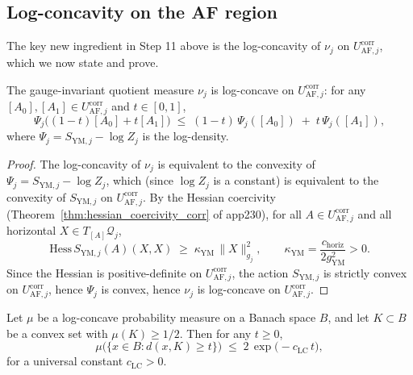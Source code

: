\subsection{Log-concavity on the AF region}
\label{ssec:app231_log_concave}

The key new ingredient in Step 11 above is the log-concavity of
$\nu_{j}$ on $U_{\mathrm{AF},j}^{\mathrm{corr}}$, which we now state
and prove.

\begin{theorem}
\label{thm:log_concave}
The gauge-invariant quotient measure $\nu_{j}$ is log-concave on
$U_{\mathrm{AF},j}^{\mathrm{corr}}$: for any $[A_{0}],[A_{1}]\in
U_{\mathrm{AF},j}^{\mathrm{corr}}$ and $t\in[0,1]$,
\begin{equation}
\label{eq:log_concave}
  \Psi_{j}\bigl((1-t)[A_{0}]+t[A_{1}]\bigr)
  \;\le\;(1-t)\,\Psi_{j}([A_{0}])\;+\;t\,\Psi_{j}([A_{1}]),
\end{equation}
where $\Psi_{j}=S_{\mathrm{YM},j}-\log Z_{j}$ is the log-density.
\end{theorem}

\begin{proof}
The log-concavity of $\nu_{j}$ is equivalent to the convexity of
$\Psi_{j}=S_{\mathrm{YM},j}-\log Z_{j}$, which (since $\log Z_{j}$ is
a constant) is equivalent to the convexity of $S_{\mathrm{YM},j}$ on
$U_{\mathrm{AF},j}^{\mathrm{corr}}$. By the Hessian coercivity
(Theorem~\ref{thm:hessian_coercivity_corr} of app230), for all
$A\in U_{\mathrm{AF},j}^{\mathrm{corr}}$ and all horizontal
$X\in T_{[A]}\mathcal{Q}_{j}$,
\begin{equation}
\label{eq:hessian_pos}
  \mathrm{Hess}\,S_{\mathrm{YM},j}(A)(X,X)
  \;\ge\;\kappa_{\mathrm{YM}}\,\|X\|_{g_{j}}^{2},
  \qquad\kappa_{\mathrm{YM}}=\frac{c_{\mathrm{horiz}}}{2g_{\mathrm{
  YM}}^{2}}>0.
\end{equation}
Since the Hessian is positive-definite on $U_{\mathrm{AF},j}^{
\mathrm{corr}}$, the action $S_{\mathrm{YM},j}$ is strictly convex on
$U_{\mathrm{AF},j}^{\mathrm{corr}}$, hence $\Psi_{j}$ is convex, hence
$\nu_{j}$ is log-concave on $U_{\mathrm{AF},j}^{\mathrm{corr}}$.
\end{proof}

\begin{lemma}
\label{lem:log_concave_tail}
Let $\mu$ be a log-concave probability measure on a Banach space
$B$, and let $K\subset B$ be a convex set with $\mu(K)\ge 1/2$. Then
for any $t\ge 0$,
\begin{equation}
\label{eq:log_concave_tail}
  \mu\bigl(\{x\in B:d(x,K)\ge t\}\bigr)
  \;\le\;2\,\exp\!\bigl(-c_{\mathrm{LC}}\,t\bigr),
\end{equation}
for a universal constant $c_{\mathrm{LC}}>0$.
\end{lemma}


